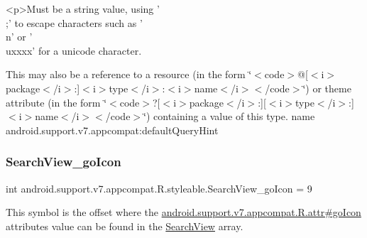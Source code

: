 \begin{DoxyVerb}      <p>Must be a string value, using '\\;' to escape characters such as '\\n' or '\\uxxxx' for a unicode character.
\end{DoxyVerb}
 

This may also be a reference to a resource (in the form \char`\"{}$<$code$>$@\mbox{[}$<$i$>$package$<$/i$>$\+:\mbox{]}$<$i$>$type$<$/i$>$\+:$<$i$>$name$<$/i$>$$<$/code$>$\char`\"{}) or theme attribute (in the form \char`\"{}$<$code$>$?\mbox{[}$<$i$>$package$<$/i$>$\+:\mbox{]}\mbox{[}$<$i$>$type$<$/i$>$\+:\mbox{]}$<$i$>$name$<$/i$>$$<$/code$>$\char`\"{}) containing a value of this type.  name android.\+support.\+v7.\+appcompat\+:default\+Query\+Hint \mbox{\label{classandroid_1_1support_1_1v7_1_1appcompat_1_1R_1_1styleable_afd493beb8db4436433dc905ac38231a1}} 
\subsubsection{\texorpdfstring{Search\+View\+\_\+go\+Icon}{SearchView\_goIcon}}
{\footnotesize\ttfamily int android.\+support.\+v7.\+appcompat.\+R.\+styleable.\+Search\+View\+\_\+go\+Icon = 9\hspace{0.3cm}{\ttfamily [static]}}

This symbol is the offset where the \hyperlink{classandroid_1_1support_1_1v7_1_1appcompat_1_1R_1_1attr_affe769b69f398d52a3cf3637c9303c60}{android.\+support.\+v7.\+appcompat.\+R.\+attr\#go\+Icon} attribute\textquotesingle{}s value can be found in the \hyperlink{classandroid_1_1support_1_1v7_1_1appcompat_1_1R_1_1styleable_a01af09df9e38f1e4f57165c3d3cee9fe}{Search\+View} array.

